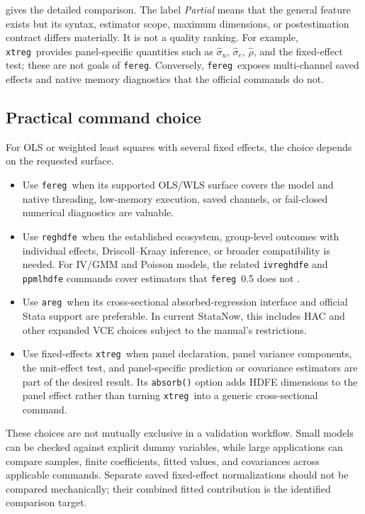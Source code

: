 \documentclass[11pt]{article}
\newcommand{\fereg}{\texttt{fereg}}
\newcommand{\reghdfe}{\texttt{reghdfe}}
\newcommand{\areg}{\texttt{areg}}
\newcommand{\xtreg}{\texttt{xtreg}}
\begin{document}
 gives the detailed comparison.  The label
\emph{Partial} means that the general feature exists but its syntax,
estimator scope, maximum dimensions, or postestimation contract differs
materially.  It is not a quality ranking.  For example, \xtreg\ provides
panel-specific quantities such as $\widehat\sigma_u$, $\widehat\sigma_e$,
$\widehat\rho$, and the fixed-effect test; these are not goals of \fereg.
Conversely, \fereg\ exposes multi-channel saved effects and native memory
diagnostics that the official commands do not.

\subsection{Practical command choice}

For OLS or weighted least squares with several fixed effects, the choice
depends on the requested surface.

\begin{itemize}
\item Use \fereg\ when its supported OLS/WLS surface covers the model and
native threading, low-memory execution, saved channels, or fail-closed
numerical diagnostics are valuable.
\item Use \reghdfe\ when the established ecosystem, group-level outcomes with
individual effects, Driscoll--Kraay inference, or broader compatibility is
needed.  For IV/GMM and Poisson models, the related \texttt{ivreghdfe} and
\texttt{ppmlhdfe} commands cover estimators that \fereg\ 0.5 does not
\citep{correia2020ppmlhdfe}.
\item Use \areg\ when its cross-sectional absorbed-regression interface and
official Stata support are preferable.  In current StataNow, this includes
HAC and other expanded VCE choices subject to the manual's restrictions.
\item Use fixed-effects \xtreg\ when panel declaration, panel variance
components, the unit-effect test, and panel-specific prediction or covariance
estimators are part of the desired result.  Its \texttt{absorb()} option adds
HDFE dimensions to the panel effect rather than turning \xtreg\ into a generic
cross-sectional command.
\end{itemize}

These choices are not mutually exclusive in a validation workflow.  Small
models can be checked against explicit dummy variables, while large
applications can compare samples, finite coefficients, fitted values, and
covariances across applicable commands.  Separate saved fixed-effect
normalizations should not be compared mechanically; their combined fitted
contribution is the identified comparison target.
\end{document}
